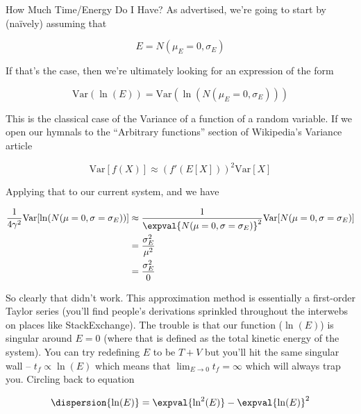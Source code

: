 \begin{answer}
\begin{answerpart}{How Much Time/Energy Do I Have?}
    As advertised, we're going to start by (na\"{i}vely) assuming that

    \begin{equation}
      E = N(\mu_E=0, \sigma_E)
    \end{equation}

    If that's the case, then we're ultimately looking for an
    expression of the form

    \begin{equation}
      \mathrm{Var}(\ln(E)) = \mathrm{Var}(\ln(N(\mu_E=0, \sigma_E)))
    \end{equation}

    This is the classical case of the Variance of a function of a
    random variable.  If we open our hymnals to the ``Arbitrary
    functions'' section of Wikipedia's Variance article

    \begin{equation}
      \mathrm{Var}[f(X)] \approx (f'(E[X]))^2\mathrm{Var}[X]
    \end{equation}

    Applying that to our current system, and we have
    
    \begin{equation}
      \begin{split}
        \frac{1}{4\gamma^2}\mathrm{Var}[\ln(N(\mu=0, \sigma=\sigma_E))]
        &\approx \frac{1}{\expval{N(\mu=0, \sigma=\sigma_E)}^2}
        \mathrm{Var}[N(\mu=0, \sigma=\sigma_E)]\\
        &= \frac{\sigma_E^2}{\mu^2}\\
        &= \frac{\sigma_E^2}{0}\\
      \end{split}
    \end{equation}

    So clearly that didn't work.  This approximation method is
    essentially a first-order Taylor series (you'll find people's
    derivations sprinkled throughout the interwebs on places like
    StackExchange).  The trouble is that our function ($\ln(E)$) is
    singular around $E=0$ (where that is defined as the total kinetic
    energy of the system).  You can try redefining $E$ to be $T + V$
    but you'll hit the same singular wall -- $t_f \propto \ln(E)$
    which means that $\lim_{E \rightarrow 0} t_f = \infty$ which will
    always trap you.  Circling back to equation 
    
    \begin{equation}
      \begin{split}
        \dispersion{\ln(E)}
        &=
        \expval{\ln^2(E)}
        - \expval{\ln(E)}^2
        \\
      \end{split}
    \end{equation}


\end{answerpart}
\end{answer}
